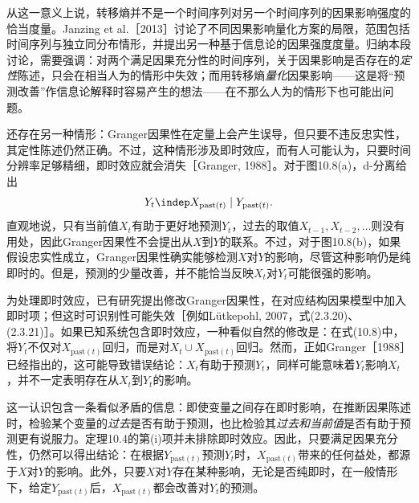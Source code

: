 从这一意义上说，转移熵并不是一个时间序列对另一个时间序列的因果影响强度的恰当度量。Janzing et al.［2013］讨论了不同因果影响量化方案的局限，范围包括时间序列与独立同分布情形，并提出另一种基于信息论的因果强度度量。归纳本段讨论，需要强调：对两个满足因果充分性的时间序列，关于因果影响是否存在的\emph{定性}陈述，只会在相当人为的情形中失效；而用转移熵\emph{量化}因果影响——这是将“预测改善”作信息论解释时容易产生的想法——在不那么人为的情形下也可能出问题。

还存在另一种情形：Granger因果性在定量上会产生误导，但只要不违反忠实性，其定性陈述仍然正确。不过，这种情形涉及即时效应，而有人可能认为，只要时间分辨率足够精细，即时效应就会消失［Granger, 1988］。对于图10.8(a)，d-分离给出
\[
 Y_t\indep X_{\mathrm{past}(t)}\mid Y_{\mathrm{past}(t)}.
\]
直观地说，只有当前值$X_t$有助于更好地预测$Y_t$，过去的取值$X_{t-1},X_{t-2},\ldots$则没有用处，因此Granger因果性不会提出从$X$到$Y$的联系。不过，对于图10.8(b)，如果假设忠实性成立，Granger因果性确实能够检测$X$对$Y$的影响，尽管这种影响仍是纯即时的。但是，预测的少量改善，并不能恰当反映$X_t$对$Y_t$可能很强的影响。


为处理即时效应，已有研究提出修改Granger因果性，在对应结构因果模型中加入即时项；但这时可识别性可能失效［例如Lütkepohl, 2007，式(2.3.20)、(2.3.21)］。如果已知系统包含即时效应，一种看似自然的修改是：在式(10.8)中，将$Y_t$不仅对$X_{\mathrm{past}(t)}$回归，而是对$X_t\cup X_{\mathrm{past}(t)}$回归。然而，正如Granger［1988］已经指出的，这可能导致错误结论：$X_t$有助于预测$Y_t$，同样可能意味着$Y_t$影响$X_t$，并不一定表明存在从$X_t$到$Y_t$的影响。

\begin{remark}[模型误设可能有帮助]
这一认识包含一条看似矛盾的信息：即使变量之间存在即时影响，在推断因果陈述时，检验某个变量的\emph{过去}是否有助于预测，也比检验其\emph{过去和当前值}是否有助于预测更有说服力。定理10.4的第(i)项并未排除即时效应。因此，只要满足因果充分性，仍然可以得出结论：在根据$Y_{\mathrm{past}(t)}$预测$Y_t$时，$X_{\mathrm{past}(t)}$带来的任何益处，都源于$X$对$Y$的影响。此外，只要$X$对$Y$存在某种影响，无论是否纯即时，在一般情形下，给定$Y_{\mathrm{past}(t)}$后，$X_{\mathrm{past}(t)}$都会改善对$Y_t$的预测。
\end{remark}
\FloatBarrier
